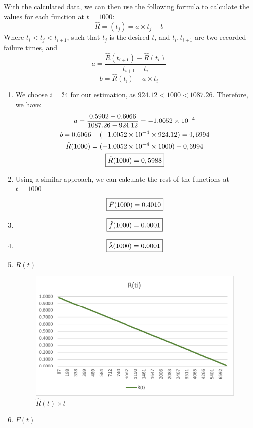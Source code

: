 \documentclass{article}
\begin{document}
    With the calculated data, we can then use the following formula to calculate the values for each function at $t = 1000$:
    \[\hat{R} = (t_j) = a \times t_j + b\]
    Where $t_i < t_j < t_{i+1}$, such that $t_j$ is the desired $t$, and $t_i, t_{i+1}$ are two recorded failure times, and
    \[a = \frac{\hat{R}(t_{i+1})- \hat{R}(t_i)}{t_{i+1} - t_i}\]
    \[b = \hat{R}(t_i) - a \times t_i\]

    \begin{enumerate}[label=(\alph*)]
        \item We choose $i = 24$ for our estimation, as $924.12 < 1000 < 1087.26$. Therefore, we have:
        \begin{gather*}
            a = \frac{0.5902 - 0.6066}{1087.26 - 924.12} = \num{-1,0052e-4} \\
            b = 0.6066 - (\num{-1,0052e-4} \times 924.12) = 0,6994 \\
            \hat{R}(1000) = (\num{-1,0052e-4} \times 1000) + 0,6994 \\
            \fbox{$\hat{R}(1000) = 0,5988$}
        \end{gather*}
        \item Using a similar approach, we can calculate the rest of the functions at $t = 1000$
        \[\fbox{$\hat{F}(1000) = 0.4010$}\]
        \item \[\fbox{$\hat{f}(1000) = 0.0001$}\]
        \item \[\fbox{$\hat{\lambda}(1000) = 0.0001$}\]
        \item $R(t)$
        \begin{figure}[H]
            \centering
            \includegraphics[width=0.8\linewidth]{q9_rt.png}
            \caption{$\hat{R}(t) \times t$}
            \label{fig:q9_rt}
        \end{figure}
        \item $F(t)$
        \begin{figure}[H]

\end{figure}
\end{enumerate}
\end{document}

